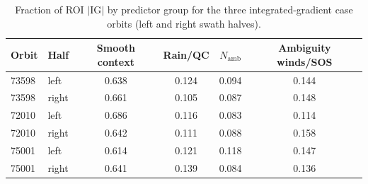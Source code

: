 \begin{table}[htbp]
\centering
\caption{Fraction of ROI $|\mathrm{IG}|$ by predictor group for the three
integrated-gradient case orbits (left and right swath halves).}
\label{tab:si_ig_group_share}
\begin{tabular}{llcccc}
\toprule
Orbit & Half & Smooth context & Rain/QC & $N_{\mathrm{amb}}$ & Ambiguity winds/SOS \\
\midrule
73598 & left  & 0.638 & 0.124 & 0.094 & 0.144 \\
73598 & right & 0.661 & 0.105 & 0.087 & 0.148 \\
72010 & left  & 0.686 & 0.116 & 0.083 & 0.114 \\
72010 & right & 0.642 & 0.111 & 0.088 & 0.158 \\
75001 & left  & 0.614 & 0.121 & 0.118 & 0.147 \\
75001 & right & 0.641 & 0.139 & 0.084 & 0.136 \\
\bottomrule
\end{tabular}
\end{table}
